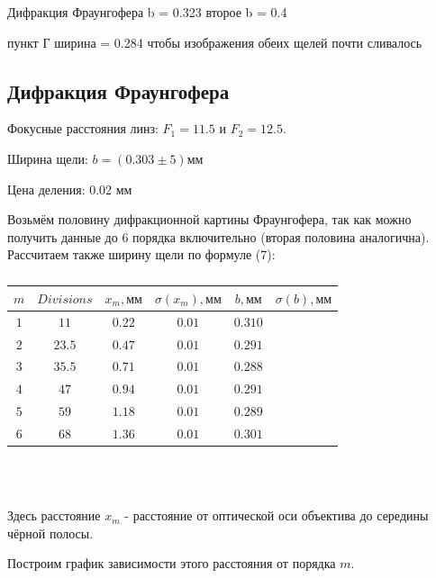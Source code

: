 \documentclass[a4paper, 12pt]{article}
\begin{document}
Дифракция Фраунгофера b = 0.323
второе b = 0.4

пункт Г
ширина = 0.284 чтобы изображения обеих щелей почти сливалось


\subsection{Дифракция Фраунгофера}

Фокусные расстояния линз: $F_1 = 11.5$ и $F_2 = 12.5$.

Ширина щели: $b = (0.303 \pm 5) \text{мм}$

Цена деления: 0.02 мм

Возьмём половину дифракционной картины Фраунгофера, так как можно получить данные до 6 порядка включительно (вторая половина аналогична). Рассчитаем также ширину щели по формуле (7):

\begin{table}[H]
\begin{center}
\begin{tabular}{|c|c|c|c|c|c|}\hline
$m$ & $Divisions$ & $x_m, \text{мм}$ & $\sigma(x_m), \text{мм}$ & $b, \text{мм}$ & $\sigma(b), \text{мм}$\\\hline
$1$ & $11$  & $0.22$ & $0.01$ & $ 0.310$\\\hline
$2$ & $23.5$ & $0.47$ & $0.01$ & $0.291$\\\hline
$3$ & $35.5$ & $0.71$ & $0.01$ & $0.288$\\\hline
$4$ & $47$ & $0.94$ & $0.01$ & $0.291$\\\hline
$5$ & $59$ & $1.18$ & $0.01$ & $0.289$\\\hline
$6$ & $68$ & $1.36$ & $0.01$ & $0.301$\\\hline
\end{tabular}\\~\\
\end{center}
\caption{\label{tab:second}}
\end{table}

Здесь расстояние $x_m$ - расстояние от оптической оси объектива до середины чёрной полосы.

Построим график зависимости этого расстояния от порядка $m$.
\end{document}
